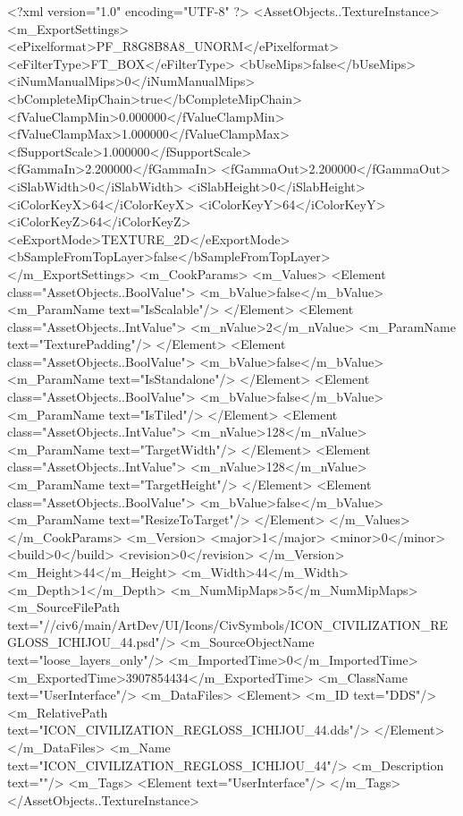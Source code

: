 <?xml version="1.0" encoding="UTF-8" ?>
<AssetObjects..TextureInstance>
	<m_ExportSettings>
		<ePixelformat>PF_R8G8B8A8_UNORM</ePixelformat>
		<eFilterType>FT_BOX</eFilterType>
		<bUseMips>false</bUseMips>
		<iNumManualMips>0</iNumManualMips>
		<bCompleteMipChain>true</bCompleteMipChain>
		<fValueClampMin>0.000000</fValueClampMin>
		<fValueClampMax>1.000000</fValueClampMax>
		<fSupportScale>1.000000</fSupportScale>
		<fGammaIn>2.200000</fGammaIn>
		<fGammaOut>2.200000</fGammaOut>
		<iSlabWidth>0</iSlabWidth>
		<iSlabHeight>0</iSlabHeight>
		<iColorKeyX>64</iColorKeyX>
		<iColorKeyY>64</iColorKeyY>
		<iColorKeyZ>64</iColorKeyZ>
		<eExportMode>TEXTURE_2D</eExportMode>
		<bSampleFromTopLayer>false</bSampleFromTopLayer>
	</m_ExportSettings>
	<m_CookParams>
		<m_Values>
			<Element class="AssetObjects..BoolValue">
				<m_bValue>false</m_bValue>
				<m_ParamName text="IsScalable"/>
			</Element>
			<Element class="AssetObjects..IntValue">
				<m_nValue>2</m_nValue>
				<m_ParamName text="TexturePadding"/>
			</Element>
			<Element class="AssetObjects..BoolValue">
				<m_bValue>false</m_bValue>
				<m_ParamName text="IsStandalone"/>
			</Element>
			<Element class="AssetObjects..BoolValue">
				<m_bValue>false</m_bValue>
				<m_ParamName text="IsTiled"/>
			</Element>
			<Element class="AssetObjects..IntValue">
				<m_nValue>128</m_nValue>
				<m_ParamName text="TargetWidth"/>
			</Element>
			<Element class="AssetObjects..IntValue">
				<m_nValue>128</m_nValue>
				<m_ParamName text="TargetHeight"/>
			</Element>
			<Element class="AssetObjects..BoolValue">
				<m_bValue>false</m_bValue>
				<m_ParamName text="ResizeToTarget"/>
			</Element>
		</m_Values>
	</m_CookParams>
	<m_Version>
		<major>1</major>
		<minor>0</minor>
		<build>0</build>
		<revision>0</revision>
	</m_Version>
	<m_Height>44</m_Height>
	<m_Width>44</m_Width>
	<m_Depth>1</m_Depth>
	<m_NumMipMaps>5</m_NumMipMaps>
	<m_SourceFilePath text="//civ6/main/ArtDev/UI/Icons/CivSymbols/ICON_CIVILIZATION_REGLOSS_ICHIJOU_44.psd"/>
	<m_SourceObjectName text="loose_layers_only"/>
	<m_ImportedTime>0</m_ImportedTime>
	<m_ExportedTime>3907854434</m_ExportedTime>
	<m_ClassName text="UserInterface"/>
	<m_DataFiles>
		<Element>
			<m_ID text="DDS"/>
			<m_RelativePath text="ICON_CIVILIZATION_REGLOSS_ICHIJOU_44.dds"/>
		</Element>
	</m_DataFiles>
	<m_Name text="ICON_CIVILIZATION_REGLOSS_ICHIJOU_44"/>
	<m_Description text=""/>
	<m_Tags>
		<Element text="UserInterface"/>
	</m_Tags>
</AssetObjects..TextureInstance>


